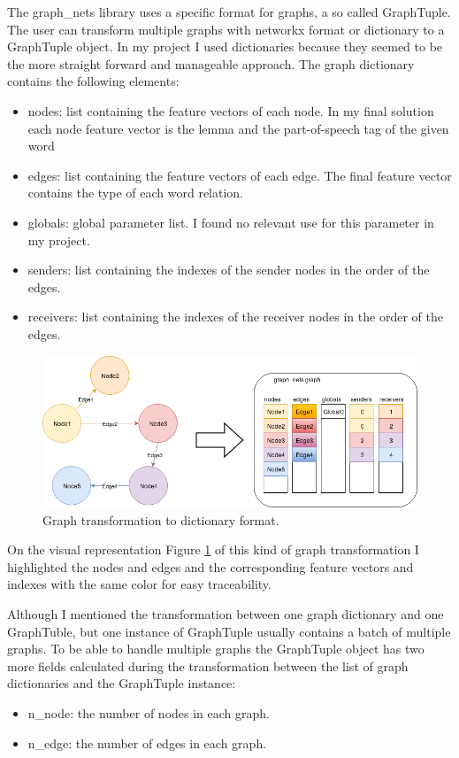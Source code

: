 The graph\_nets library uses a specific format for graphs, a so called GraphTuple. The user can transform multiple graphs with networkx format or dictionary	 to a GraphTuple object. In my project I used dictionaries because they seemed to be the more straight forward and manageable approach.
The graph dictionary contains the following elements:
\begin{itemize}
	\item nodes: list containing the feature vectors of each node. In my final solution each node feature vector is the lemma and the part-of-speech tag of the given word 
	\item edges: list containing the feature vectors of each edge. The final feature vector contains the type of each word relation.
	\item globals: global parameter list. I found no relevant use for this parameter in my project.
	\item senders: list containing the indexes of the sender nodes in the order of the edges.
	\item receivers: list containing the indexes of the receiver nodes in the order of the edges.
\end{itemize}

\begin{figure}[!ht]
	\centering
	\includegraphics[width=150mm, keepaspectratio]{figures/transform_color.png}
	\caption{Graph transformation to dictionary format.}
	\label{fig:transform_graph}
\end{figure}

On the visual representation Figure \ref{fig:transform_graph} of this kind of graph transformation I highlighted the nodes and edges and the corresponding feature vectors and indexes with the same color for easy traceability.
\FloatBarrier

Although I mentioned the transformation between one graph dictionary and one GraphTuble, but one instance of GraphTuple usually contains a batch of multiple graphs. To be able to handle multiple graphs the GraphTuple object has two more fields calculated during the transformation between the list of graph dictionaries and the GraphTuple instance:
\begin{itemize}
	\item n\_node: the number of nodes in each graph.
	\item n\_edge: the number of edges in each graph.
\end{itemize}

